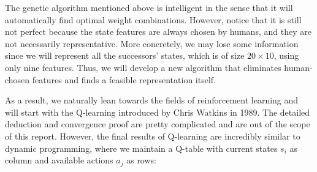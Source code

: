 \documentclass[letterpaper]{article} %
\begin{document}
The genetic algorithm mentioned above is intelligent in the sense that it will automatically find optimal weight combinations. However, notice that it is still not perfect because the state features are always chosen by humans, and they are not necessarily representative. More concretely, we may lose some information since we will represent all the successors' states, which is of size $20\times 10$, using only nine features. Thus, we will develop a new algorithm that eliminates human-chosen features and finds a feasible representation itself.

As a result, we naturally lean towards the fields of reinforcement learning and will start with the Q-learning introduced by Chris Watkins in 1989. The detailed deduction and convergence proof are pretty complicated and are out of the scope of this report. However, the final results of Q-learning are incredibly similar to dynamic programming, where we maintain a Q-table with current states $s_i$ as column and available actions $a_j$ as rows:
\end{document}

